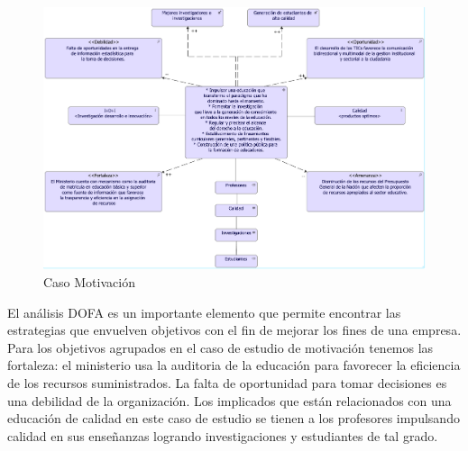 \begin{figure}[h!]
	\centering
	\includegraphics[width=1.0\linewidth]{imgs/motivacion/motivacion/motivacion}
	\caption{Caso Motivación}
\end{figure}

El análisis DOFA es un importante elemento que permite encontrar las estrategias que envuelven objetivos con el fin de mejorar los fines de una empresa. Para los objetivos agrupados en el caso de estudio de motivación tenemos las fortaleza: el ministerio usa la auditoria de la educación para favorecer la eficiencia de los recursos suministrados. La falta de oportunidad para tomar decisiones es una debilidad de la organización. Los implicados que están relacionados con una educación de calidad en este caso de estudio se tienen a los profesores impulsando calidad en sus enseñanzas logrando investigaciones y estudiantes de tal grado.    

